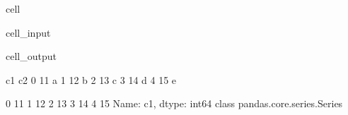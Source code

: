 \documentclass[letterpaper,10pt,english]{jupyterBook}
\begin{document}
\begin{sphinxuseclass}{cell}\begin{sphinxVerbatimInput}

\begin{sphinxuseclass}{cell_input}
\begin{sphinxVerbatim}[commandchars=\\\{\}]
  \PYG{p}{[}\PYG{p}{]}
  \PYG{p}{[}\PYG{p}{]}

     
   


\PYG{p}{[}\PYG{p}{]} \PYG{p}{[}\PYG{p}{]}
\end{sphinxVerbatim}

\end{sphinxuseclass}\end{sphinxVerbatimInput}
\begin{sphinxVerbatimOutput}

\begin{sphinxuseclass}{cell_output}
\begin{sphinxVerbatim}[commandchars=\\\{\}]
   c1 c2
0  11  a
1  12  b
2  13  c
3  14  d
4  15  e


0    11
1    12
2    13
3    14
4    15
Name: c1, dtype: int64 \PYGZlt{}class \PYGZsq{}pandas.core.series.Series\PYGZsq{}\PYGZgt{}
\end{sphinxVerbatim}

\end{sphinxuseclass}\end{sphinxVerbatimOutput}

\end{sphinxuseclass}
\end{document}
